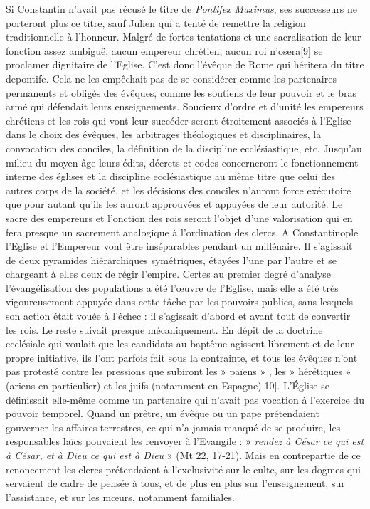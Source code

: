  Si Constantin n'avait pas récusé le titre de \emph{Pontifex Maximus}, ses successeurs ne porteront plus ce titre, sauf Julien qui a tenté de remettre la religion traditionnelle à l'honneur. Malgré de fortes tentations et une sacralisation de leur fonction assez ambiguë, aucun empereur chrétien, aucun roi n'osera[9] se proclamer dignitaire de l'Eglise. C'est donc l'évêque de Rome qui héritera du titre de\emph{}pontife\emph{.} Cela ne les empêchait pas de se considérer comme les partenaires permanents et obligés des évêques, comme les soutiens de leur pouvoir et le bras armé qui défendait leurs enseignements. Soucieux d'ordre et d'unité les empereurs chrétiens et les rois qui vont leur succéder seront étroitement associés à l'Eglise dans le choix des évêques, les arbitrages théologiques et disciplinaires, la convocation des conciles, la définition de la discipline ecclésiastique, etc. Jusqu'au milieu du moyen-âge leurs édits, décrets et codes concerneront le fonctionnement interne des églises et la discipline ecclésiastique au même titre que celui des autres corps de la société, et les décisions des conciles n'auront force exécutoire que pour autant qu'ils les auront approuvées et appuyées de leur autorité. Le sacre des empereurs et l'onction des rois seront l'objet d'une valorisation qui en fera presque un sacrement analogique à l'ordination des clercs. A Constantinople l'Eglise et l'Empereur vont être inséparables pendant un millénaire. Il s'agissait de deux pyramides hiérarchiques symétriques, étayées l'une par l'autre et se chargeant à elles deux de régir l'empire. 
 Certes au premier degré d'analyse l'évangélisation des populations a été l'œuvre de l'Eglise, mais elle a été très vigoureusement appuyée dans cette tâche par les pouvoirs publics, sans lesquels son action était vouée à l'échec : il s'agissait d'abord et avant tout de convertir les rois. Le reste suivait presque mécaniquement. En dépit de la doctrine ecclésiale qui voulait que les candidats au baptême agissent librement et de leur propre initiative, ils l'ont parfois fait sous la contrainte, et tous les évêques n'ont pas protesté contre les pressions que subiront les » païens » , les » hérétiques » (ariens en particulier) et les juifs (notamment en Espagne)[10]. 
 L'Église se définissait elle-même comme un partenaire qui n'avait pas vocation à l'exercice du pouvoir temporel. Quand un prêtre, un évêque ou un pape prétendaient gouverner les affaires terrestres, ce qui n'a jamais manqué de se produire, les responsables laïcs pouvaient les renvoyer à l'Evangile : » \emph{rendez à César ce qui est à César, et à Dieu ce qui est à Dieu} » (Mt 22, 17-21). Mais en contrepartie de ce renoncement les clercs prétendaient à l'exclusivité sur le culte, sur les dogmes qui servaient de cadre de pensée à tous, et de plus en plus sur l'enseignement, sur l'assistance, et sur les mœurs, notamment familiales. 
